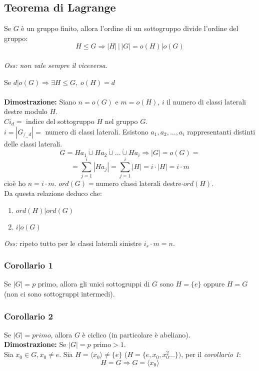\subsection{Teorema di Lagrange}
Se \(G\) è un gruppo finito, allora l'ordine di un sottogruppo divide l'ordine del gruppo:
\[H\leq G\Rightarrow |H|\,|\, |G| = o(H)|o(G)\] 
\\\textit{Oss: non vale sempre il viceversa.}

Se \(d|o(G)\Rightarrow\exists H\leq G,\; o(H)=d\)
\\\\\textbf{Dimostrazione:} Siano \(n=o(G)\) e \(m=o(H)\), \(i\) il numero di classi laterali destre modulo \(H\).
\\\(Ci_d=\) indice del sottogruppo \(H\) nel gruppo \(G\).
\\\(i=|G_{/_\sim d}|=\) numero di classi laterali.
Esistono \(a_1,a_2,...,a_i\) rappresentanti distinti delle classi laterali.
\[G=Ha_1\dot\cup Ha_2\dot\cup...\dot\cup Ha_i\Rightarrow |G|=o(G)=\]
\[=\sum ^i_{j=1} |Ha_j|=\sum ^i_{j=1} |H|=i\cdot |H|=i\cdot m\]
cioè ho \(n=i\cdot m\). \(ord(G)=\)numero classi laterali destre\(\cdot ord(H)\).
\\Da questa relazione deduco che:
\begin{enumerate}

	\item \(ord(H)|ord(G)\)

	\item \(i|o(G)\)

\end{enumerate}

\textit{Oss:} ripeto tutto per le classi laterali sinistre \(i_s\cdot m=n\).

\subsubsection{Corollario 1}
Se \(|G|=p\) primo, allora gli unici sottogruppi di \(G\) sono \(H=\{e\}\) oppure \(H=G\) (non ci sono sottogruppi intermedi).

\subsubsection{Corollario 2}
Se \(|G|=primo\), allora \(G\) è ciclico (in particolare è abeliano).
\\
\textbf{Dimostrazione:} Se \(|G|=p\) primo\(>1\).
\\Sia \(x_0\in G, x_0\neq e\). Sia \(H=\langle x_0\rangle\neq \{e\}\) (\(H=\{e,x_0,x_0^2...\})\), per il \textit{corollario 1}: 
\[H=G\Rightarrow G=\langle x_0\rangle\]

